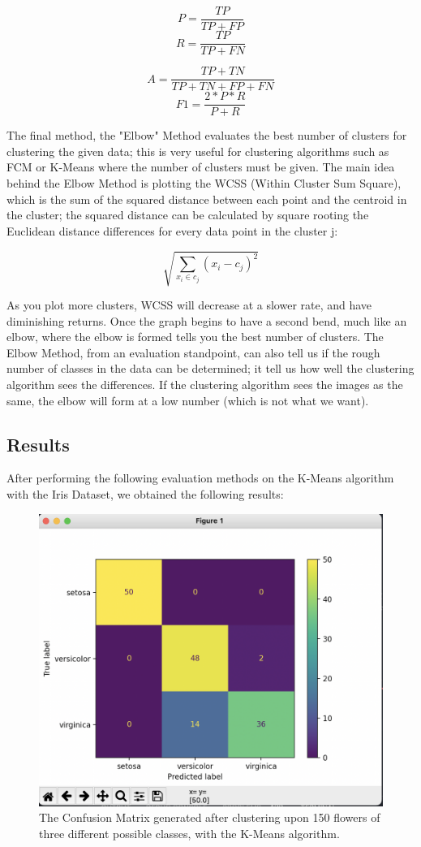 \documentclass[10pt,twocolumn]{article}
\begin{document}
\[P = \frac{TP}{TP + FP}\]
\[R = \frac{TP}{TP + FN}\]

\[A = \frac{TP + TN}{TP + TN + FP + FN}\]
\[F1 = \frac{2 * P * R}{P + R}\]

The final method, the "Elbow" Method evaluates the best number of clusters for clustering the given data; this is very useful for clustering algorithms such as FCM or K-Means where the number of clusters must be given. The main idea behind the Elbow Method is plotting the WCSS (Within Cluster Sum Square), which is the sum of the squared distance between each point and the centroid in the cluster; the squared distance can be calculated by square rooting the Euclidean distance differences for every data point in the cluster j:

\[\sqrt{\sum_{x_i \in c_j}(x_{i} - c_{j})^2}\]

As you plot more clusters, WCSS will decrease at a slower rate, and have diminishing returns. Once the graph begins to have a second bend, much like an elbow, where the elbow is formed tells you the best number of clusters. The Elbow Method, from an evaluation standpoint, can also tell us if the rough number of classes in the data can be determined; it tell us how well the clustering algorithm sees the differences. If the clustering algorithm sees the images as the same, the elbow will form at a low number (which is not what we want).

\subsection{Results}
After performing the following evaluation methods on the K-Means algorithm with the Iris Dataset, we obtained the following results:

\begin{figure}[h]
  \centering
  \includegraphics[scale=0.3]{confusion_matrix.png}
  \vspace{20px}
  \caption{The Confusion Matrix generated after clustering upon 150 flowers of three different possible classes, with the K-Means algorithm.}
  \label{confusion_matrix}
\end{figure}
\end{document}
